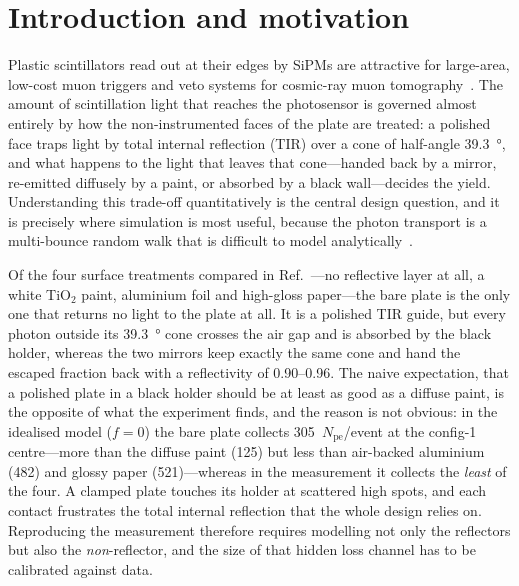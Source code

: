 \documentclass[11pt,a4paper]{article}
\newcommand{\pe}{\ensuremath{N_{\mathrm{pe}}}}
\begin{document}
\tableofcontents
\vspace{0.5em}

\section{Introduction and motivation}

Plastic scintillators read out at their edges by SiPMs are attractive for
large-area, low-cost muon triggers and veto systems for cosmic-ray muon
tomography~\cite{Borozdin2003,Bonechi2020}. The amount of scintillation
light that reaches the photosensor is governed almost entirely by how the
non-instrumented faces of the plate are treated: a polished face traps light
by total internal reflection (TIR) over a cone of half-angle
\SI{39.3}{\degree}, and what happens to the light that leaves that
cone---handed back by a mirror, re-emitted diffusely by a paint, or absorbed
by a black wall---decides the yield. Understanding this trade-off
quantitatively is the central design question, and it is precisely where
simulation is most useful, because the photon transport is a multi-bounce
random walk that is difficult to model analytically~\cite{Korpachev2017}.

Of the four surface treatments compared in
Ref.~\cite{Rao2025}---no reflective layer at all, a white TiO$_2$ paint,
aluminium foil and high-gloss paper---the bare plate is the only one that
returns no light to the plate at all. It is a polished TIR guide, but every
photon outside its \SI{39.3}{\degree} cone crosses the air gap and is
absorbed by the black holder, whereas the two mirrors keep exactly the same
cone and hand the escaped fraction back with a reflectivity of
\num{0.90}--\num{0.96}. The naive expectation, that a polished plate in a
black holder should be at least as good as a diffuse paint, is the
opposite of what the experiment finds, and the reason is not obvious: in the
idealised model ($f=0$) the bare plate collects \num{305}~\pe/event at the
config-1 centre---more than the diffuse paint (\num{125}) but less than
air-backed aluminium (\num{482}) and glossy paper (\num{521})---whereas in the
measurement it collects the \emph{least} of the four. A clamped plate touches
its holder at scattered high spots, and each contact frustrates the total
internal reflection that the whole design relies on. Reproducing the
measurement therefore requires modelling not only the reflectors but also
the \emph{non}-reflector, and the size of that hidden loss channel has to be
calibrated against data.
\end{document}
